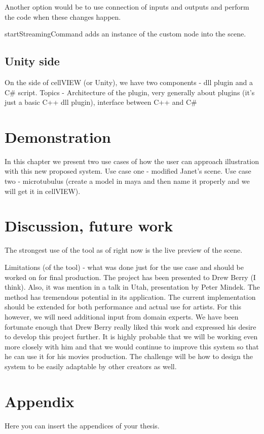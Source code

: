 \documentclass[
  digital, %
  table,   %
  nolof,     %
  nolot,     %
]{fithesis3}
\begin{document}
Another option would be to use connection of inputs and outputs and perform the code when these changes happen.

startStreamingCommand adds an instance of the custom node into the scene. 


\section{Unity side}
On the side of cellVIEW (or Unity), we have two components - dll plugin and a C\# script.
Topics - Architecture of the plugin, very generally about plugins (it's just a basic C++ dll plugin), interface between C++ and C\#

\chapter{Demonstration}
In this chapter we present two use cases of how the user can approach illustration with this new proposed system.
Use case one - modified Janet's scene.
Use case two - microtubulus (create a model in maya and then name it properly and we will get it in cellVIEW).

\chapter{Discussion, future work}
The strongest use of the tool as of right now is the live preview of the scene. 

Limitations (of the tool) - what was done just for the use case and should be worked on for final production.
The project has been presented to Drew Berry (I think). Also, it was mention in a talk in Utah, presentation by Peter Mindek.
The method has tremendous potential in its application. The current implementation should be extended for both performance and actual use for artists. For this however, we will need additional input from domain experts. We have been fortunate enough that Drew Berry really liked this work and expressed his desire to develop this project further. It is highly probable that we will be working even more closely with him and that we would continue to improve this system so that he can use it for his movies production.
The challenge will be how to design the system to be easily adaptable by other creators as well.


\newpage
\printbibliography[heading=bibintoc]

\appendix %
\chapter{Appendix}
Here you can insert the appendices of your thesis.
\end{document}
